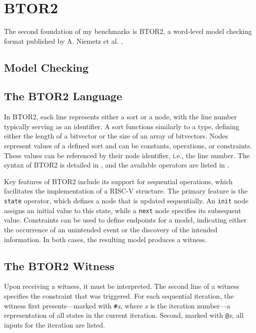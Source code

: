 \chapter{BTOR2}\label{chap:btor2}

The second foundation of my benchmarks is BTOR2, a word-level model
checking format published by A. Niemetz et al. \cite{btor2}.

\section{Model Checking}

\section{The BTOR2 Language}
In BTOR2, each line represents either a sort or a node, with the line
number typically serving as an identifier. A sort functions similarly
to a type, defining either the length of a bitvector or the size of
an array of bitvectors. Nodes represent values of a defined sort and
can be constants, operations, or constraints. These values can be
referenced by their node identifier, i.e., the line number. The
syntax of BTOR2 is detailed in \cite[Figure 1]{btor2}, and the
available operators are listed in \cite[Table 1]{btor2}.

Key features of BTOR2 include its support for sequential operations,
which facilitates the implementation of a RISC-V structure. The
primary feature is the \texttt{state} operator, which defines a node
that is updated sequentially. An \texttt{init} node assigns an
initial value to this state, while a \texttt{next} node specifies its
subsequent value. Constraints can be used to define endpoints for a
model, indicating either the occurrence of an unintended event or the
discovery of the intended information. In both cases, the resulting
model produces a witness.

\section{The BTOR2 Witness}\label{witness}
Upon receiving a witness, it must be interpreted. The second line of
a witness specifies the constraint that was triggered. For each
sequential iteration, the witness first presents—marked with
\texttt{\#}\textit{x}, where \textit{x} is the iteration number—a
representation of all states in the current iteration. Second, marked
with \texttt{@}\textit{x}, all inputs for the iteration are listed.

